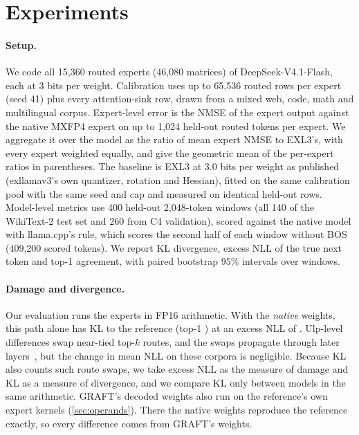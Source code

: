 \section{Experiments}
\label{sec:experiments}

\paragraph{Setup.} We code all 15,360 routed experts (46,080 matrices) of DeepSeek-V4.1-Flash, each at 3 bits per
weight. Calibration uses up to 65,536 routed rows per expert (seed 41) plus every attention-sink row, drawn from a
mixed web, code, math and multilingual corpus. Expert-level error is the NMSE of the expert output against the native
MXFP4 expert on up to 1,024 held-out routed tokens per expert. We aggregate it over the model as the ratio of mean
expert NMSE to EXL3's, with every expert weighted equally, and give the geometric mean of the per-expert ratios in
parentheses. The baseline is EXL3 at 3.0 bits per weight as published (exllamav3's own quantizer, rotation and
Hessian), fitted on the same calibration pool with the same seed and cap and measured on identical held-out rows.
Model-level metrics use 400 held-out 2,048-token windows (all 140 of the WikiText-2 test set and 260 from C4
validation), scored against the native model with llama.cpp's rule, which scores the second half of each window
without BOS (409,200 scored tokens). We report KL divergence, excess NLL of the true next token and top-1 agreement,
with paired bootstrap 95\% intervals over windows.

\paragraph{Damage and divergence.} Our evaluation runs the experts in FP16 arithmetic. With the \emph{native}
weights, this path alone has KL  to the reference (top-1 ) at an excess NLL of .
Ulp-level differences swap near-tied top-$k$ routes, and the swaps propagate through later
layers~\citep{fu2025eaquant,park2026vsraq,gu2026routeflip}, but the change in mean NLL on these corpora is negligible.
Because KL also counts such route swaps, we take excess NLL as the measure of damage and KL as a measure of divergence,
and we compare KL only between models in the same arithmetic. GRAFT's decoded weights also run on the
reference's own expert kernels (\cref{sec:operands}). There the native weights reproduce the reference exactly, so
every difference comes from GRAFT's weights.

